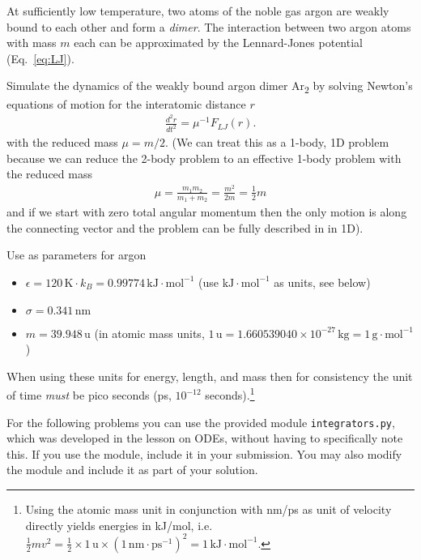 \documentclass[paper=letter]{scrartcl}
\begin{document}
At sufficiently low temperature, two atoms of the noble gas argon are
weakly bound to each other and form a \emph{dimer}. The interaction
between two argon atoms with mass $m$ each can be approximated by the
Lennard-Jones potential (Eq.~\ref{eq:LJ}).

Simulate the dynamics of the weakly bound argon dimer
Ar\textsubscript{2} by solving Newton's equations of motion for the
interatomic distance $r$
\begin{gather}
  \label{eq:eom}
  \frac{d^2 r}{dt^2} = \mu^{-1} F_{LJ}(r).
\end{gather}
with the reduced mass $\mu = m/2$. (We can treat this as a 1-body, 1D
problem because we can reduce the 2-body problem to an effective
1-body problem with the reduced mass
\begin{gather}
  \label{eq:mu}
  \mu = \frac{m_{1} m_{2}}{m_{1} + m_{2}} = \frac{m^{2}}{2m} = \frac{1}{2}m
\end{gather}
and if we start with zero total angular momentum then the only motion
is along the connecting vector and the problem can be fully described
in in 1D).

Use as parameters for argon
\begin{itemize}
\item
  $\epsilon = 120\,\text{K} \cdot k_B =
  0.99774\,\text{kJ}\cdot\text{mol}^{-1}$ (use
  $\text{kJ}\cdot\text{mol}^{-1}$ as units, see below)
\item $\sigma = 0.341\,\text{nm}$ 
\item $m = 39.948\,\text{u}$ (in atomic mass units,
  $1\,\text{u} = 1.660539040 \times 10^{-27}\,\text{kg} =
  1\,\text{g}\cdot\text{mol}^{-1}$)
\end{itemize}
When using these units for energy, length, and mass then for
consistency the unit of time \emph{must} be pico seconds (ps,
$10^{-12}$ seconds).\footnote{Using the atomic mass unit in
  conjunction with nm/ps as unit of velocity directly yields energies
  in kJ/mol, i.e.
  $\frac{1}{2} m v^{2} = \frac{1}{2} \times 1\,\text{u} \times
  (1\,\text{nm}\cdot\text{ps}^{-1})^2 =
  1\,\text{kJ}\cdot\text{mol}^{-1}$.}

For the following problems you can use the provided module
\texttt{integrators.py}, which was developed in the lesson on ODEs,
without having to specifically note this. If you use the module,
include it in your submission. You may also modify the module and
include it as part of your solution.
\end{document}
